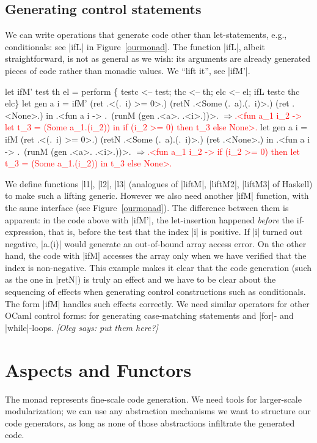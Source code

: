 \documentclass[draft]{elsart}
\newcommand{\evalresult}[1]{\ensuremath{\Longrightarrow}\textcolor{red}{#1}}
\newcommand{\oleg}[1]{{\it [Oleg says: #1]}}
\begin{document}
\subsection{Generating control statements}
We can write operations that generate code other than let-statements,
e.g., conditionals: see |ifL| in Figure~\ref{ourmonad}. The function |ifL|, 
albeit straightforward, is not as general as we wish: its arguments are
already generated pieces of code rather than monadic values. We
``lift it'', see |ifM'|. 
\begin{code}
let ifM' test th el = perform \{
  testc <-- test; thc <-- th; elc <-- el;
  ifL testc thc elc\}
let gen a i = ifM' (ret .<(.~i) >= 0>.) 
                   (retN .<Some (.~a).(.~i)>.) (ret .<None>.)
 in .<fun a i -> .~(runM (gen .<a>. .<i>.))>.
\evalresult{.<fun a_1 i_2 -> \protect\newline
let t_3 = (Some a_1.(i_2)) in if (i_2 >= 0) then t_3 else None>.}
let gen a i = ifM (ret .<(.~i) >= 0>.) 
                  (retN .<Some (.~a).(.~i)>.) (ret .<None>.)
 in .<fun a i -> .~(runM (gen .<a>. .<i>.))>.
\evalresult{.<fun a_1 i_2 -> 
if (i_2 >= 0) then let t_3 = (Some a_1.(i_2)) in t_3 else None>.}
\end{code}
%
We define functions |l1|,
|l2|, |l3| (analogues of |liftM|, |liftM2|, |liftM3| of Haskell) 
to make such a lifting generic. However we also need
another |ifM| function, with the same
interface (see Figure~\ref{ourmonad}).
The difference between them is
apparent: in the code above with |ifM'|, the let-insertion
happened \emph{before} the if-expression, that is, before the test that
the index |i| is positive. If |i| turned out
negative, |a.(i)| would generate an out-of-bound array access
error. On the other hand, the code with |ifM| accesses the array only
when we have verified that the index is non-negative. This example
makes it clear that the code generation (such as the one in |retN|) is 
truly an effect and we have to be clear about the sequencing of
effects when generating control constructions such as conditionals.
The form |ifM| handles such effects correctly. We
need similar operators for other OCaml control forms: for generating
case-matching statements and |for|- and |while|-loops.
\oleg{put them here?}


\section{Aspects and Functors}\label{functors}
The monad represents fine-scale code generation. We need tools for
larger-scale modularization; we can use any abstraction
mechanisms we want to structure our code generators, as long as none
of those abstractions infiltrate the generated code.
\end{document}
